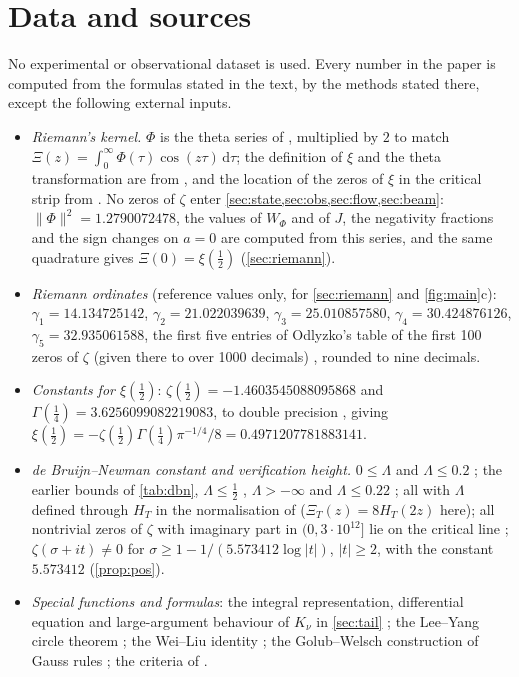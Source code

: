 \documentclass[11pt]{article}
\theoremstyle{definition}\newtheorem{definition}[theorem]{Definition}
\theoremstyle{remark}\newtheorem{remark}[theorem]{Remark}
\newcommand{\dd}{\,\mathrm d}\newcommand{\e}{\mathrm e}
\begin{document}
\section{Data and sources}\label{sec:data}
No experimental or observational dataset is used. Every number in the paper is computed from the formulas stated in the text, by the methods stated there, except the following external inputs.
\begin{itemize}
\item \emph{Riemann's kernel.} $\Phi$ is the theta series of \cite[\S2.16]{Titchmarsh}, multiplied by $2$ to match $\Xi(z)=\int_0^\infty\Phi(\tau)\cos(z\tau)\dd\tau$; the definition of $\xi$ and the theta transformation are from \cite[Ch.~2]{Titchmarsh}, and the location of the zeros of $\xi$ in the critical strip from \cite[\S2.12 and Ch.~3]{Titchmarsh}. No zeros of $\zeta$ enter \cref{sec:state,sec:obs,sec:flow,sec:beam}: $\|\Phi\|^2=1.2790072478$, the values of $W_\Phi$ and of $J$, the negativity fractions and the sign changes on $a=0$ are computed from this series, and the same quadrature gives $\Xi(0)=\xi(\frac12)$ (\cref{sec:riemann}).
\item \emph{Riemann ordinates} (reference values only, for \cref{sec:riemann} and \cref{fig:main}c): $\gamma_1=14.134725142$, $\gamma_2=21.022039639$, $\gamma_3=25.010857580$, $\gamma_4=30.424876126$, $\gamma_5=32.935061588$, the first five entries of Odlyzko's table of the first 100 zeros of $\zeta$ (given there to over 1000 decimals) \cite{Odlyzko}, rounded to nine decimals.
\item \emph{Constants for $\xi(\frac12)$}: $\zeta(\frac12)=-1.4603545088095868$ and $\Gamma(\frac14)=3.6256099082219083$, to double precision \cite{OEIS}, giving $\xi(\frac12)=-\zeta(\frac12)\Gamma(\frac14)\pi^{-1/4}/8=0.4971207781883141$.
\item \emph{de Bruijn--Newman constant and verification height.} $0\le\Lambda$ \cite{RT} and $\Lambda\le0.2$ \cite[Cor.~2]{PT}; the earlier bounds of \cref{tab:dbn}, $\Lambda\le\frac12$ \cite{deBruijn}, $\Lambda>-\infty$ \cite{Newman} and $\Lambda\le0.22$ \cite{Polymath}; all with $\Lambda$ defined through $H_T$ in the normalisation of \cite{Polymath} ($\Xi_T(z)=8H_T(2z)$ here); all nontrivial zeros of $\zeta$ with imaginary part in $(0,3\cdot10^{12}]$ lie on the critical line \cite{PT}; $\zeta(\sigma+it)\ne0$ for $\sigma\ge1-1/(5.573412\log|t|)$, $|t|\ge2$, with the constant $5.573412$ \cite{MT} (\cref{prop:pos}).
\item \emph{Special functions and formulas}: the integral representation, differential equation and large-argument behaviour of $K_\nu$ in \cref{sec:tail} \cite[\S\S10.25, 10.32, 10.40]{DLMF}; the Lee--Yang circle theorem \cite{LeeYang}; the Wei--Liu identity \cite{WeiLiu}; the Golub--Welsch construction of Gauss rules \cite{GolubWelsch}; the criteria of \cite{SD,Lagarias,Patrick,CV}.

\end{itemize}
\end{document}
